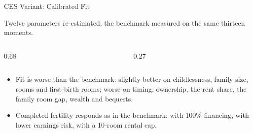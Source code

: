 \begin{frame}[t]{CES Variant: Calibrated Fit}

\footnotesize
Twelve parameters re-estimated; the benchmark measured on the same thirteen moments.
\smallskip

{\scriptsize\linespread{0.9}\selectfont\renewcommand{\arraystretch}{0.85}\setlength{\tabcolsep}{3pt}%
\begin{columns}[T]
\begin{column}{0.68\textwidth}

\end{column}
\begin{column}{0.27\textwidth}

\end{column}
\end{columns}}
\smallskip

{\linespread{1}\selectfont
\begin{itemize}\setlength\itemsep{1pt}\setlength\topsep{0pt}
\item Fit is worse than the benchmark: slightly better on childlessness, family size, rooms and first-birth rooms; worse on timing, ownership, the rent share, the family room gap, wealth and bequests.
\item Completed fertility responds as in the benchmark: \cesLTVhundred{} with 100\% financing, \cesLowerRisk{} with lower earnings risk, \cesCapTen{} with a 10-room rental cap.
\end{itemize}}
\end{frame}





